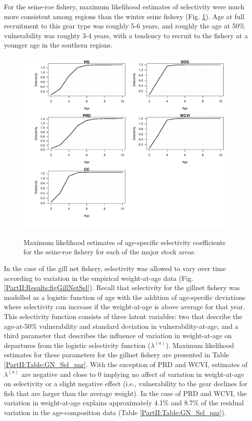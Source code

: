 For the seine-roe fishery, maximum likelihood estimates of selectivity were much more consistent among regions than the winter seine fishery (Fig. \ref{PartII:Results:figSeineRoeSel}).  Age at full recruitment to this gear type was roughly 5-6 years, and roughly the age at 50\% vulnerability was roughty 3-4 years, with a tendency to recruit to the fishery at a younger age in the southern regions.

\begin{figure}[!tbp]
	\includegraphics[width=\textwidth]{../FIGS/qPriorFigs/iscam_fig_sel2d_seine_roe_sel.pdf}\\
	\caption{Maximum likelihood estimates of age-specific selectivity coefficients for the seine-roe fishery for each of the major stock areas.}\label{PartII:Results:figSeineRoeSel}
\end{figure}

In the case of the gill net fishery, selectivity was allowed to vary over time according to variation in the empirical weight-at-age data (Fig. \ref{PartII:Results:figGillNetSel}).  Recall that selectivity for the gillnet fishery was modelled as a logistic function of age with the addition of age-specific deviations where selectivity can increase if the weight-at-age is above average for that year.  This selectivity function consists of three latent variables: two that describe the age-at-50\% vulnerability and standard deviation in vulnerability-at-age, and a third parameter that describes the influence of variation in weight-at-age on departures from the logistic selectivity function ($\lambda^{(a)}$).  Maximum likelihood estimates for these parameters for the gillnet fishery are presented in Table \ref{PartII:Table:GN_Sel_par}.  With the exception of PRD and WCVI, estimates of $\lambda^{(a)}$ are negative and close to 0 implying no affect of variation in weight-at-age on selectivity or a slight negative effect (i.e., vulnerability to the gear declines for fish that are larger than the average weight).  In the case of PRD and WCVI, the variation in weight-at-age explains approximately 4.1\% and 8.7\% of the residual variation in the age-composition data (Table \ref{PartII:Table:GN_Sel_par}).

